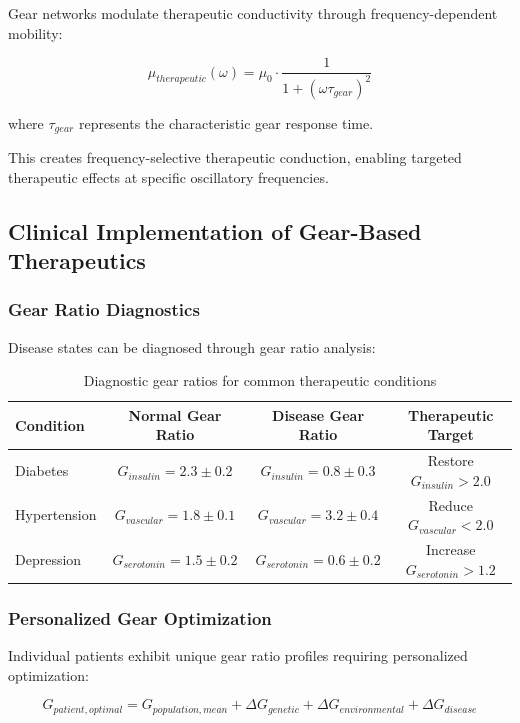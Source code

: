 \documentclass[12pt,a4paper]{article}
\begin{document}
Gear networks modulate therapeutic conductivity through frequency-dependent mobility:

\begin{equation}
\mu_{therapeutic}(\omega) = \mu_0 \cdot \frac{1}{1 + (\omega \tau_{gear})^2}
\end{equation}

where $\tau_{gear}$ represents the characteristic gear response time.

This creates frequency-selective therapeutic conduction, enabling targeted therapeutic effects at specific oscillatory frequencies.

\subsection{Clinical Implementation of Gear-Based Therapeutics}

\subsubsection{Gear Ratio Diagnostics}

Disease states can be diagnosed through gear ratio analysis:

\begin{table}[htbp]
\centering
\begin{tabular}{|l|c|c|c|}
\hline
\textbf{Condition} & \textbf{Normal Gear Ratio} & \textbf{Disease Gear Ratio} & \textbf{Therapeutic Target} \\
\hline
Diabetes & $G_{insulin} = 2.3 \pm 0.2$ & $G_{insulin} = 0.8 \pm 0.3$ & Restore $G_{insulin} > 2.0$ \\
Hypertension & $G_{vascular} = 1.8 \pm 0.1$ & $G_{vascular} = 3.2 \pm 0.4$ & Reduce $G_{vascular} < 2.0$ \\
Depression & $G_{serotonin} = 1.5 \pm 0.2$ & $G_{serotonin} = 0.6 \pm 0.2$ & Increase $G_{serotonin} > 1.2$ \\
\hline
\end{tabular}
\caption{Diagnostic gear ratios for common therapeutic conditions}
\end{table}

\subsubsection{Personalized Gear Optimization}

Individual patients exhibit unique gear ratio profiles requiring personalized optimization:

\begin{equation}
G_{patient,optimal} = G_{population,mean} + \Delta G_{genetic} + \Delta G_{environmental} + \Delta G_{disease}
\end{equation}
\end{document}
